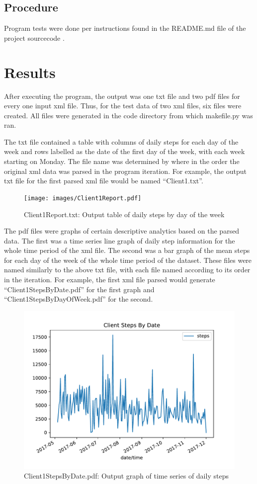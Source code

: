 \documentclass[sigconf]{acmart}
\begin{document}
\subsection{Procedure}

Program tests were done per instructions found in the README.md file of the project sourcecode \cite{sourcecode}.

\section{Results}
After executing the program, the output was one txt file and two pdf files for every one input xml file. Thus, for the test data of two xml files, six files were created. All files were generated in the code directory from which makefile.py was ran. 

The txt file contained a table with columns of daily steps for each day of the week and rows labelled as the date of the first day of the week, with each week starting on Monday. The file name was determined by where in the order the original xml data was parsed in the program iteration. For example, the output txt file for the first parsed xml file would be named ``Client1.txt''.

\begin{figure}
\texttt{[image: images/Client1Report.pdf]}
\caption{Client1Report.txt: Output table of daily steps by day of the week}
\end{figure}

The pdf files were graphs of certain descriptive analytics based on the parsed data. The first was a time series line graph of daily step information for the whole time period of the xml file. The second was a bar graph of the mean steps for each day of the week of the whole time period of the dataset. These files were named similarly to the above txt file, with each file named according to its order in the iteration. For example, the first xml file parsed would generate ``Client1StepsByDate.pdf'' for the first graph and ``Client1StepsByDayOfWeek.pdf'' for the second.

\begin{figure}
\includegraphics{images/Client1StepsByDate.pdf}
\caption{Client1StepsByDate.pdf: Output graph of time series of daily steps}
\end{figure}
\end{document}
